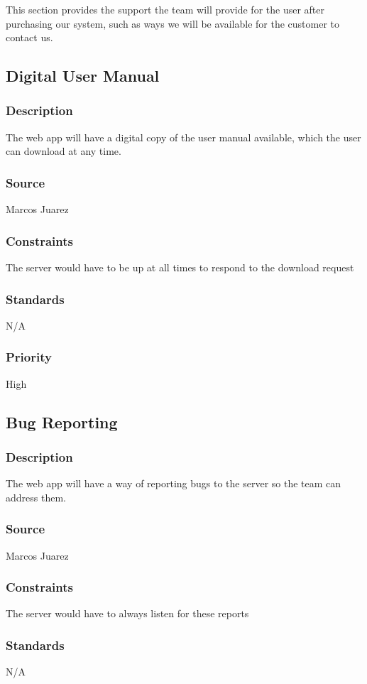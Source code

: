 This section provides the support the team will provide for the user after purchasing our system, such as ways we will be available for the customer to contact us.

\subsection{Digital User Manual}
\subsubsection{Description}
The web app will have a digital copy of the user manual available, which the user can download at any time.
\subsubsection{Source}
Marcos Juarez
\subsubsection{Constraints}
The server would have to be up at all times to respond to the download request
\subsubsection{Standards}
N/A
\subsubsection{Priority}
High

\subsection{Bug Reporting}
\subsubsection{Description}
The web app will have a way of reporting bugs to the server so the team can address them.
\subsubsection{Source}
Marcos Juarez
\subsubsection{Constraints}
The server would have to always listen for these reports
\subsubsection{Standards}
N/A
